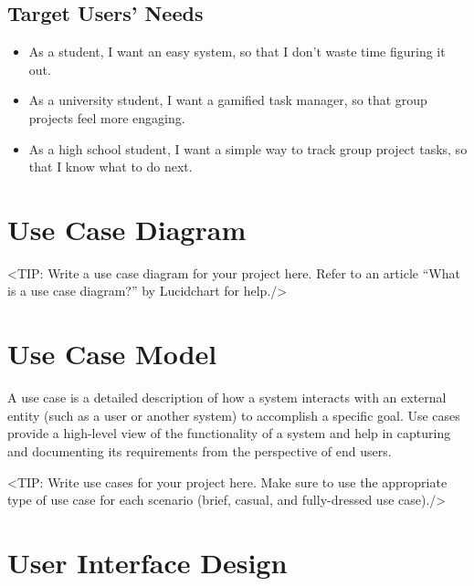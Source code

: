 \subsection{Target Users' Needs}
\begin{itemize}
    \item As a student, I want an easy system, so that I don’t waste time figuring it out.
    \item As a university student, I want a gamified task manager, so that group projects feel more engaging.
    \item As a high school student, I want a simple way to track group project tasks, so that I know what to do next.
\end{itemize}



\section{Use Case Diagram}
\label{section:use-case-diagram}
<TIP: Write a use case diagram for your project here. Refer to an
article “What is a use case diagram?” by Lucidchart for help./>

\section{Use Case Model}
\label{section:use-case-model}
A use case is a detailed description of how a system
interacts with an external entity (such as a user or another system) to
accomplish a specific goal. Use cases provide a high-level view of the
functionality of a system and help in capturing and documenting its
requirements from the perspective of end users.

<TIP: Write use cases for your project here. Make sure to use the
appropriate type of use case for each scenario (brief, casual, and fully-dressed
use case)./>

\newpage
\section{User Interface Design}
\label{section:user-interface-design}

